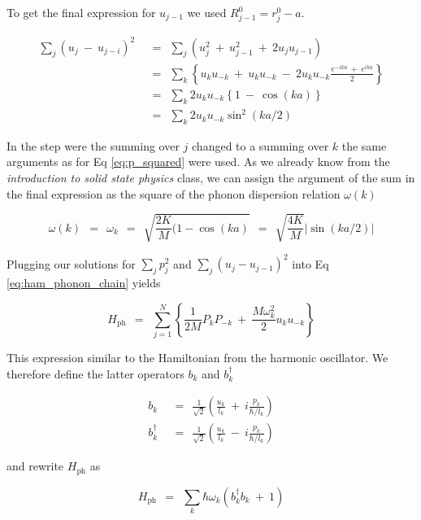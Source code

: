 \documentclass[10pt]{report}
\numberwithin{equation}{chapter}
\newcommand{\refEq}[1]{
  Eq  \ref{#1}
}
\begin{document}
To get the final expression for $u_{j-1}$ we used $R_{j-1}^0=r_j^0-a$.

\begin{align}
  \sum_j (u_j ~-~ u_{j-i})^2 ~~& =~~ \sum_j (u_j^2 ~+~ u_{j-1}^2 ~+~ 2u_j u_{j-1})\nonumber \\
  ~~& =~~ \sum_k \left\{ u_k u_{-k} ~+~ u_k u_{-k} ~-~ 2u_k u_{-k} \frac{e^{-ika} ~+~ e^{ika}}{2} \right\}\nonumber \\ 
  ~~& =~~ \sum_k 2 u_k u_{-k} \left\{1 ~-~ \cos(ka) \right\}\nonumber \\
  ~~& =~~ \sum_k 2 u_k u_{-k} \sin^2(ka/2)
\end{align}

In the step were the summing over $j$ changed to a summing over $k$ the same arguments as for \refEq{eq:p_squared} were used. As we already know from the \textit{introduction to solid state physics} class, we can assign the argument of the sum in the final expression as the square of the phonon dispersion relation $\omega(k)$

\begin{equation}\label{eq:dispersion_relation}
  \omega(k) ~~=~~ \omega_k ~~=~~  \sqrt{\frac{2K}{M}(1-\cos(ka)} ~~=~~ 
  \sqrt{\frac{4K}{M}} |\sin(ka/2)|
\end{equation}

Plugging our solutions for $\sum_j p_j^2$ and $\sum_j (u_j-u_{j-1})^2$ into \refEq{eq:ham_phonon_chain} yields

\begin{equation}\label{eq:ham_phonon_chain2}
  H_\text{ph} ~~=~~ \sum_{j=1}^N \left\{ \frac{1}{2M} P_k P_{-k} ~+~ \frac{M \omega_k^2}{2} u_k u_{-k} \right\} 
\end{equation}

This expression similar to the Hamiltonian from the harmonic oscillator. We therefore define the latter operators $b_k$ and $b_k^\dag$

\begin{align}
  b_k ~~& =~~ \frac{1}{\sqrt{2}} \left( \frac{u_k}{l_k} ~+~ i \frac{p_k}{\hbar/l_k} \right)\\
  b_k^\dag ~~& =~~ \frac{1}{\sqrt{2}} \left( \frac{u_k}{l_k} ~-~ i\frac{p_k}{\hbar/l_k} \right)
\end{align}

and rewrite $H_\text{ph}$ as 

\begin{equation}
  H_\text{ph} ~~=~~ \sum_k \hbar \omega_k (b^\dag_k b_k ~+~ 1)
\end{equation}
\end{document}

